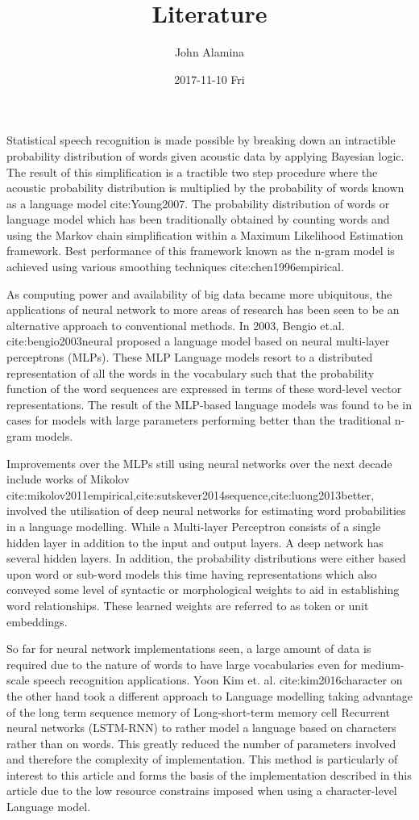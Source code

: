 \documentclass[11pt]{article}
\author{John Alamina}
\date{2017-11-10 Fri}
\title{Literature}
\begin{document}
\maketitle
\tableofcontents

Statistical speech recognition is made possible by breaking down an intractible probability distribution of words given acoustic data by applying Bayesian logic. The result of this simplification is a tractible two step procedure where the acoustic probability distribution is multiplied by the probability of words known as a language model cite:Young2007.  The probability distribution of words or language model which has been traditionally obtained by counting words and using the Markov chain simplification within a Maximum Likelihood Estimation framework.  Best performance of this framework known as the n-gram model is achieved using various smoothing techniques cite:chen1996empirical. 

As computing power and availability of big data became more ubiquitous, the applications of neural network to more areas of research has been seen to be an alternative approach to conventional methods. In 2003, Bengio et.al. cite:bengio2003neural proposed a language model based on neural multi-layer perceptrons (MLPs). These MLP Language models resort to a distributed representation of all the words in the vocabulary such that the probability function of the word sequences are expressed in terms of these word-level vector representations. The result of the MLP-based language models was found to be in cases for models with large parameters performing better than the traditional n-gram models.

Improvements over the MLPs still using neural networks over the next decade include works of Mikolov cite:mikolov2011empirical,cite:sutskever2014sequence,cite:luong2013better, involved the utilisation of deep neural networks for estimating word probabilities in a language modelling.  While a Multi-layer Perceptron consists of a single hidden layer in addition to the input and output layers.  A deep network has several hidden layers.  In addition, the probability distributions were either based upon word or sub-word models this time having representations which also conveyed some level of syntactic or morphological weights to aid in establishing word relationships.  These learned weights are referred to as token or unit embeddings.

So far for neural network implementations seen, a large amount of data is required due to the nature of words to have large vocabularies even for medium-scale speech recognition applications.  Yoon Kim et. al. cite:kim2016character on the other hand took a different approach to Language modelling taking advantage of the long term sequence memory of Long-short-term memory cell Recurrent neural networks (LSTM-RNN) to rather model a language based on characters rather than on words.  This greatly reduced the number of parameters involved and therefore the complexity of implementation.  This method is particularly of interest to this article and forms the basis of the implementation described in this article due to the low resource constrains imposed when using a character-level Language model.
\end{document}
